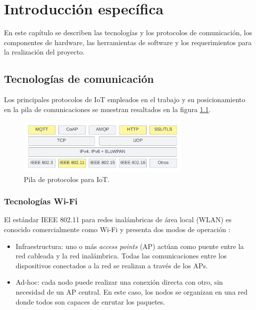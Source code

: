 \chapter{Introducción específica} %

\label{Chapter2}

En este capítulo se describen las tecnologías y los protocolos de comunicación, los componentes de hardware, las herramientas de software y los requerimientos para la realización del proyecto.

\section{Tecnologías de comunicación}
\label{sec:Tecnologías de comunicación}
Los principales protocolos de IoT empleados en el trabajo y su posicionamiento en la pila de comunicaciones se muestran resaltados en la figura \ref{fig:IotProtocols}.


\begin{figure}[h]
	\centering
	\includegraphics[width=0.75\textwidth]{./Figures/protocols.jpeg}
	\caption[Pila de protocolos para IoT.]{Pila de protocolos para IoT\protect\footnotemark.}
	\label{fig:IotProtocols}

\end{figure}

\subsection{Tecnologías Wi-Fi}
\label{sec:Tecnologías Wi-Fi}
El estándar IEEE 802.11 para redes inalámbricas de área local (WLAN) es conocido comercialmente como Wi-Fi y presenta dos modos de operación \citep{wifi}:
\begin{itemize}
\item Infraestructura: uno o más \textit{access points} (AP) actúan como puente entre la red cableada y la red inalámbrica. Todas las comunicaciones entre los dispositivos conectados a la red se realizan a través de los APs. 
\item Ad-hoc: cada nodo puede realizar una conexión directa con otro, sin necesidad de un AP central. En este caso, los nodos se organizan en una red donde todos son capaces de enrutar los paquetes.  
\end{itemize}

